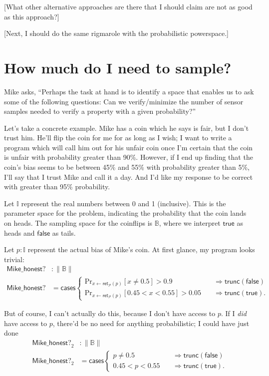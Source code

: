 \documentclass{article}           %
\newcommand{\bool}{\mathbb{B}}
\newcommand{\Prob}{\mathcal{P}}
\newcommand{\ret}[1]{\mathsf{ret}_{#1}}
\begin{document}
[What other alternative approaches are there that I should claim are not as good as this approach?]

[Next, I should do the same rigmarole with the probabilistic powerspace.]

\section{How much do I need to sample?}

Mike asks, ``Perhaps the task at hand is to identify a space that enables us to ask
some of the following questions: Can we verify/minimize the number of sensor samples needed to verify a property with a given probability?''

Let's take a concrete example. Mike has a coin which he says is fair, but I don't trust him. He'll flip the coin for me for as long as I wish; I want to write a program which will call him out for his unfair coin once I'm certain that the coin is unfair with probability greater than 90\%. However, if I end up finding that the coin's bias seems to be between 45\% and 55\% with probability greater than 5\%, I'll say that I trust Mike and call it a day. And I'd like my response to be correct with greater than 95\% probability.

Let $\mathbb{I}$ represent the real numbers between 0 and 1 (inclusive). This is the parameter space for the problem, indicating the probability that the coin lands on heads. The sampling space for the coinflips is $\bool$, where we interpret $\mathsf{true}$ as heads and $\mathsf{false}$ as tails.

Let $p : \mathbb{I}$ represent the actual bias of Mike's coin. At first glance, my program looks trivial:
\begin{align*}
\mathsf{Mike\_honest?} &: \| \bool\|
\\ \mathsf{Mike\_honest?} &= \mathsf{cases}
\begin{cases}
\text{Pr}_{x \leftarrow \ret{\Prob}(p)} \left[ x \ne 0.5 \right] > 0.9
  \quad &\Longrightarrow
   \mathsf{trunc}(\mathsf{false})
\\
\text{Pr}_{x \leftarrow \ret{\Prob}(p)} \left[ 0.45 < x < 0.55 \right] > 0.05
  \quad &\Longrightarrow
   \mathsf{trunc}(\mathsf{true}).
\end{cases}
\end{align*}

But of course, I can't actually do this, because I don't have access to $p$. If I \emph{did} have access to $p$, there'd be no need for anything probabilistic; I could have just done
\begin{align*}
\mathsf{Mike\_honest?}_2 &: \| \bool\|
\\ \mathsf{Mike\_honest?}_2 &= \mathsf{cases}
\begin{cases}
p \ne 0.5 
  \quad &\Longrightarrow
   \mathsf{trunc}(\mathsf{false})
\\
0.45 < p < 0.55
  \quad &\Longrightarrow
   \mathsf{trunc}(\mathsf{true}).
\end{cases}
\end{align*}
\end{document}
